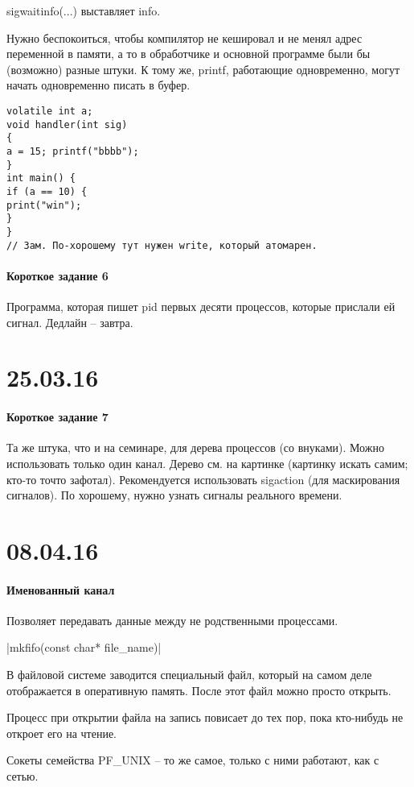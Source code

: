 \documentclass[a4paper,10pt]{article}
\newcommand{\cl}{\mint{c}}
\begin{document}
sigwaitinfo(...) выставляет info.

Нужно беспокоиться, чтобы компилятор не кешировал и не менял адрес переменной в памяти, а то в обработчике и основной программе были бы (возможно) разные штуки. К тому же, printf, работающие одновременно, могут начать одновременно писать в буфер.

\begin{verbatim}
volatile int a; 
void handler(int sig)
{
a = 15; printf("bbbb"); 
}
int main() {
if (a == 10) {
print("win");
}
}
// Зам. По-хорошему тут нужен write, который атомарен.
\end{verbatim}

\paragraph{Короткое задание 6}
Программа, которая пишет pid первых десяти процессов, которые прислали ей сигнал. Дедлайн -- завтра.

\section{25.03.16}
\paragraph{Короткое задание 7}
Та же штука, что и на семинаре, для дерева процессов (со внуками). Можно использовать только один канал. Дерево см. на картинке (картинку искать самим; кто-то точто зафотал).
Рекомендуется использовать sigaction (для маскирования сигналов). По хорошему, нужно узнать сигналы реального времени.

\section{08.04.16}
\paragraph{Именованный канал}
Позволяет передавать данные между не родственными процессами.

\cl|mkfifo(const char* file_name)|

В файловой системе заводится специальный файл, который на самом деле отображается в оперативную память. После этот файл можно просто открыть.

Процесс при открытии файла на запись повисает до тех пор, пока кто-нибудь не откроет его на чтение.

Сокеты семейства PF\_UNIX -- то же самое, только с ними работают, как с сетью.
\end{document}
